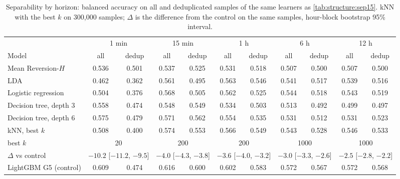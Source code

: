\begin{table}[p]
\centering
\caption{Separability by horizon: balanced accuracy on all and deduplicated samples of the
same learners as \cref{tab:structure:sep15}.  kNN with the best $k$ on 300{,}000
samples; $\Delta$ is the difference from the control on the same samples, hour-block
bootstrap 95\% interval.}
\label{tab:structure:seph}
\footnotesize
\begin{fittable}\begin{tabular}{lcccccccccc}
\toprule
& \multicolumn{2}{c}{1 min} & \multicolumn{2}{c}{15 min} & \multicolumn{2}{c}{1 h} & \multicolumn{2}{c}{6 h} & \multicolumn{2}{c}{12 h} \\
\cmidrule(lr){2-3}\cmidrule(lr){4-5}\cmidrule(lr){6-7}\cmidrule(lr){8-9}\cmidrule(lr){10-11}
Model & all & dedup & all & dedup & all & dedup & all & dedup & all & dedup \\
\midrule
Mean Reversion-$H$     & 0.536 & 0.501 & 0.537 & 0.525 & 0.531 & 0.518 & 0.507 & 0.500 & 0.507 & 0.500 \\
LDA                    & 0.462 & 0.362 & 0.561 & 0.495 & 0.563 & 0.546 & 0.541 & 0.517 & 0.539 & 0.516 \\
Logistic regression    & 0.504 & 0.376 & 0.568 & 0.505 & 0.562 & 0.525 & 0.544 & 0.518 & 0.543 & 0.519 \\
Decision tree, depth 3 & 0.558 & 0.474 & 0.548 & 0.549 & 0.534 & 0.503 & 0.513 & 0.492 & 0.499 & 0.497 \\
Decision tree, depth 6 & 0.575 & 0.479 & 0.571 & 0.562 & 0.554 & 0.535 & 0.531 & 0.512 & 0.531 & 0.523 \\
kNN, best $k$          & 0.508 & 0.400 & 0.574 & 0.553 & 0.566 & 0.549 & 0.543 & 0.528 & 0.546 & 0.533 \\
\quad best $k$ & \multicolumn{2}{c}{20} & \multicolumn{2}{c}{200} & \multicolumn{2}{c}{200} & \multicolumn{2}{c}{1000} & \multicolumn{2}{c}{1000} \\
\quad $\Delta$ vs control & \multicolumn{2}{c}{$-10.2$ [$-11.2$, $-9.5$]} & \multicolumn{2}{c}{$-4.0$ [$-4.3$, $-3.8$]} & \multicolumn{2}{c}{$-3.6$ [$-4.0$, $-3.2$]} & \multicolumn{2}{c}{$-3.0$ [$-3.3$, $-2.6$]} & \multicolumn{2}{c}{$-2.5$ [$-2.8$, $-2.2$]} \\
LightGBM G5 (control)  & 0.609 & 0.474 & 0.616 & 0.600 & 0.602 & 0.583 & 0.572 & 0.567 & 0.572 & 0.568 \\
\bottomrule
\end{tabular}\end{fittable}
\end{table}

